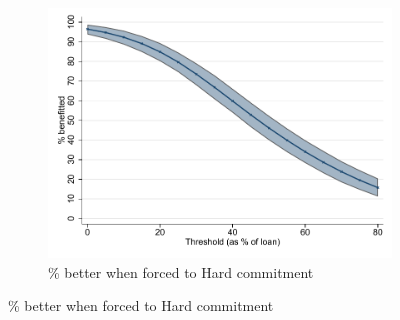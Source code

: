 \documentclass[oneside,11pt]{article}
\begin{document}
\begin{figure}[H]
\begin{center}
\begin{subfigure}{0.45\textwidth}
    \end{subfigure}
        \begin{subfigure}{0.45\textwidth}
        \caption{\% better when forced to Hard commitment}
        \centering
        \includegraphics[width=\textwidth]{Figuras/line_better_forceall_apr_te_cf.pdf}
        
    \end{subfigure}
    

\end{center}
\end{figure}
\end{document}
